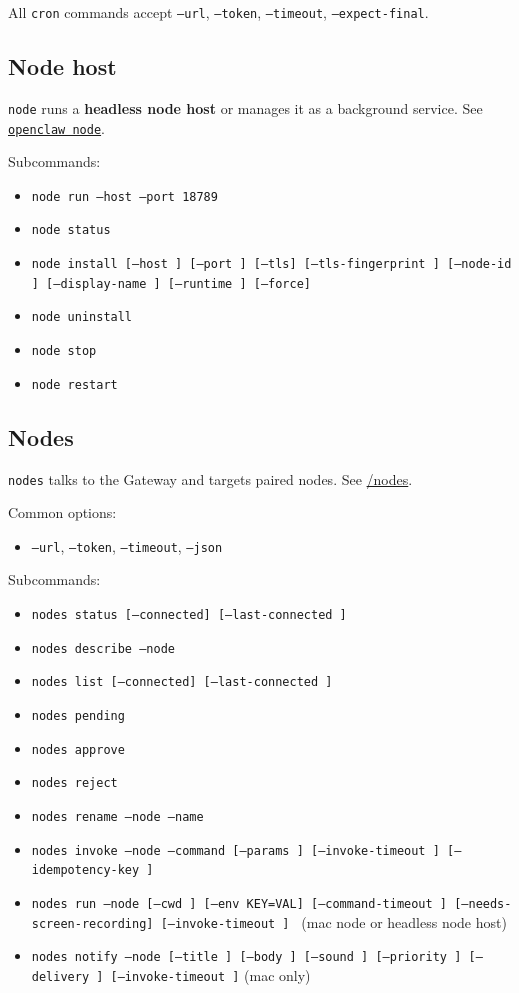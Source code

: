 All \texttt{cron} commands accept \texttt{--url}, \texttt{--token}, \texttt{--timeout}, \texttt{--expect-final}.

\subsection{Node host}


\texttt{node} runs a \textbf{headless node host} or manages it as a background service. See
\href{/cli/node}{\texttt{openclaw node}}.

Subcommands:

\begin{itemize}
  \item \texttt{node run --host  --port 18789}
  \item \texttt{node status}
  \item \texttt{node install [--host ] [--port ] [--tls] [--tls-fingerprint ] [--node-id ] [--display-name ] [--runtime ] [--force]}
  \item \texttt{node uninstall}
  \item \texttt{node stop}
  \item \texttt{node restart}
\end{itemize}


\subsection{Nodes}


\texttt{nodes} talks to the Gateway and targets paired nodes. See \href{/nodes}{/nodes}.

Common options:

\begin{itemize}
  \item \texttt{--url}, \texttt{--token}, \texttt{--timeout}, \texttt{--json}
\end{itemize}


Subcommands:

\begin{itemize}
  \item \texttt{nodes status [--connected] [--last-connected ]}
  \item \texttt{nodes describe --node }
  \item \texttt{nodes list [--connected] [--last-connected ]}
  \item \texttt{nodes pending}
  \item \texttt{nodes approve }
  \item \texttt{nodes reject }
  \item \texttt{nodes rename --node  --name }
  \item \texttt{nodes invoke --node  --command  [--params ] [--invoke-timeout ] [--idempotency-key ]}
  \item \texttt{nodes run --node  [--cwd ] [--env KEY=VAL] [--command-timeout ] [--needs-screen-recording] [--invoke-timeout ] } (mac node or headless node host)
  \item \texttt{nodes notify --node  [--title ] [--body ] [--sound ] [--priority ] [--delivery ] [--invoke-timeout ]} (mac only)
\end{itemize}


